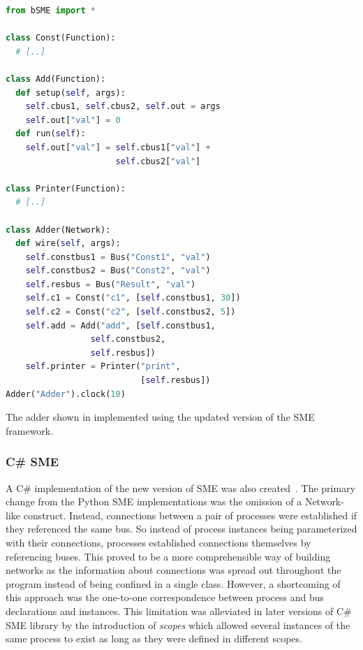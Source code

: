 \begin{widefigure}
  \begin{multicols}{2}
    \small
\begin{lstlisting}[language=python]
from bSME import *

class Const(Function):
  # [..]

class Add(Function):
  def setup(self, args):
    self.cbus1, self.cbus2, self.out = args
    self.out["val"] = 0
  def run(self):
    self.out["val"] = self.cbus1["val"] +
                      self.cbus2["val"]

class Printer(Function):
  # [..]

class Adder(Network):
  def wire(self, args):
    self.constbus1 = Bus("Const1", "val")
    self.constbus2 = Bus("Const2", "val")
    self.resbus = Bus("Result", "val")
    self.c1 = Const("c1", [self.constbus1, 30])
    self.c2 = Const("c2", [self.constbus2, 5])
    self.add = Add("add", [self.constbus1,
                 self.constbus2,
                 self.resbus])
    self.printer = Printer("print",
                           [self.resbus])
Adder("Adder").clock(10)
\end{lstlisting}
  \end{multicols}
\caption{The adder shown in  implemented using the updated
  version of the SME framework.}
\label{fig:adder2}
\end{widefigure}

\subsubsection{C\# SME}
A C\# implementation of the new version of SME was also
created~\cite{skovhede2016building}. The primary change from the Python SME
implementations was the omission of a {\ttfamily Network}-like
construct. Instead, connections between a pair of processes were established if
they referenced the same bus. So instead of process instances being
parameterized with their connections, processes established connections
themselves by referencing buses. This proved to be a more comprehensible way of
building networks as the information about connections was spread out throughout
the program instead of being confined in a single class.  However, a shortcoming
of this approach was the one-to-one correspondence between process and bus
declarations and instances. This limitation was alleviated in later versions of
C\# SME library by the introduction of {\itshape scopes} which allowed several
instances of the same process to exist as long as they were defined in different
scopes.

